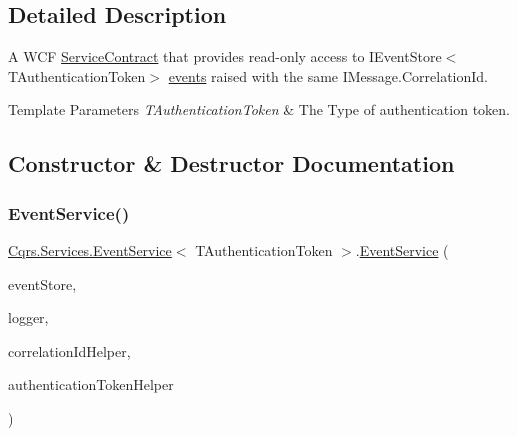 \subsection{Detailed Description}
A W\+CF \hyperlink{}{Service\+Contract} that provides read-\/only access to I\+Event\+Store$<$\+T\+Authentication\+Token$>$ \hyperlink{}{events} raised with the same I\+Message.\+Correlation\+Id. 


\begin{DoxyTemplParams}{Template Parameters}
{\em T\+Authentication\+Token} & The Type of authentication token.\\
\hline
\end{DoxyTemplParams}


\subsection{Constructor \& Destructor Documentation}
\mbox{\label{classCqrs_1_1Services_1_1EventService_ac5896c2eb4efbdb42b3cad774b688e45_ac5896c2eb4efbdb42b3cad774b688e45}} 
\subsubsection{\texorpdfstring{Event\+Service()}{EventService()}}
{\footnotesize\ttfamily \hyperlink{classCqrs_1_1Services_1_1EventService}{Cqrs.\+Services.\+Event\+Service}$<$ T\+Authentication\+Token $>$.\hyperlink{classCqrs_1_1Services_1_1EventService}{Event\+Service} (\begin{DoxyParamCaption}\item[{\hyperlink{interfaceCqrs_1_1Events_1_1IEventStore}{I\+Event\+Store}$<$ T\+Authentication\+Token $>$}]{event\+Store,  }\item[{I\+Logger}]{logger,  }\item[{I\+Correlation\+Id\+Helper}]{correlation\+Id\+Helper,  }\item[{\hyperlink{interfaceCqrs_1_1Authentication_1_1IAuthenticationTokenHelper}{I\+Authentication\+Token\+Helper}$<$ T\+Authentication\+Token $>$}]{authentication\+Token\+Helper }\end{DoxyParamCaption})\hspace{0.3cm}{\ttfamily [protected]}}



